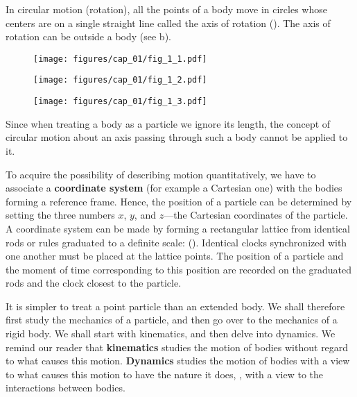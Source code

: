 In circular motion (rotation), all the points of a body move in circles whose centers are on a single straight line called the axis of rotation (). The axis of rotation can be outside a body (see b).

\begin{figure}[t]
	\begin{minipage}[t]{0.5\linewidth}
		\begin{center}
			\texttt{[image: figures/cap\_01/fig\_1\_1.pdf]}
			\caption[]{}
			\label{fig:1_1}
		\end{center}
	\end{minipage}
	\hfill{ }%
	\begin{minipage}[t]{0.5\linewidth}
		\begin{center}
			\texttt{[image: figures/cap\_01/fig\_1\_2.pdf]}
			\caption[]{}
			\label{fig:1_2}
		\end{center}
	\end{minipage}
\end{figure}

\begin{figure}[t]
	\begin{center}
		\texttt{[image: figures/cap\_01/fig\_1\_3.pdf]}
		\caption[]{}
		\label{fig:1_3}
	\end{center}
	\vspace{-0.8cm}
\end{figure}

Since when treating a body as a particle we ignore its length, the concept of circular motion about an axis passing through such a body cannot be applied to it.

To acquire the possibility of describing motion quantitatively, we have to associate a \textbf{coordinate system} (for example a Cartesian one) with the bodies forming a reference frame. Hence, the position of a particle can be determined by setting the three numbers $x$, $y$, and $z$---the Cartesian coordinates of the particle. A coordinate system can be made by forming a rectangular lattice from identical rods or rules graduated to a definite scale: (). Identical clocks synchronized with one another must be placed at the lattice points. The position of a particle and the moment of time corresponding to this position are recorded on the graduated rods and the clock closest to the particle.

It is simpler to treat a point particle than an extended body. We shall therefore first study the mechanics of a particle, and then go over to the mechanics of a rigid body. We shall start with kinematics, and then delve into dynamics. We remind our reader that \textbf{kinematics} studies the motion of bodies without regard to what causes this motion. \textbf{Dynamics} studies the motion of bodies with a view to what causes this motion to have the nature it does, \ie, with a view to the interactions between bodies.

